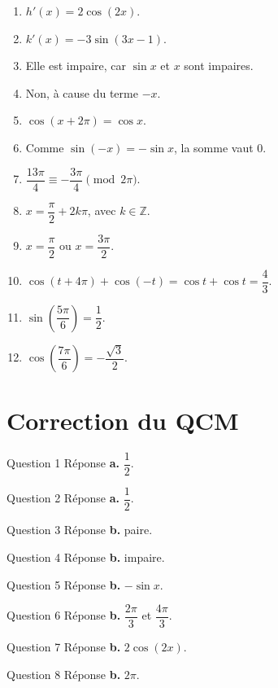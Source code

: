 \documentclass[11pt,a4paper]{article}
\newcounter{reponse}
\newenvironment{blocreponses}[1]{%
  \begin{tcolorbox}[enhanced,breakable,colback=bleuclair,colframe=bleufonce,boxrule=0.6pt,arc=2mm,left=2mm,right=2mm,top=2mm,bottom=1.5mm,title={\bfseries #1},coltitle=white,colbacktitle=bleufonce,before skip=3mm,after skip=3mm, fontupper=\large]
  \large
  \begin{enumerate}[leftmargin=*,label=\textbf{\arabic*.},itemsep=0.42em,topsep=0.5em]
  \setcounter{enumi}{\value{reponse}}
}{%
  \setcounter{reponse}{\value{enumi}}
  \end{enumerate}
  \end{tcolorbox}
}
\begin{document}
\begin{blocreponses}{Réponses 25 à 36}
\item $h'(x)=2\cos(2x)$.
\item $k'(x)=-3\sin(3x-1)$.
\item Elle est impaire, car $\sin x$ et $x$ sont impaires.
\item Non, à cause du terme $-x$.
\item $\cos(x+2\pi)=\cos x$.
\item Comme $\sin(-x)=-\sin x$, la somme vaut $0$.
\item $\dfrac{13\pi}{4}\equiv -\dfrac{3\pi}{4}\pmod{2\pi}$.
\item $x=\dfrac{\pi}{2}+2k\pi$, avec $k\in\mathbb Z$.
\item $x=\dfrac{\pi}{2}$ ou $x=\dfrac{3\pi}{2}$.
\item $\cos(t+4\pi)+\cos(-t)=\cos t+\cos t=\dfrac43$.
\item $\sin\left(\dfrac{5\pi}{6}\right)=\dfrac12$.
\item $\cos\left(\dfrac{7\pi}{6}\right)=-\dfrac{\sqrt3}{2}$.
\end{blocreponses}
\section*{Correction du QCM}
\begin{correctionbox}{Question 1}
Réponse \textbf{a.} $\dfrac12$.
\end{correctionbox}
\begin{correctionbox}{Question 2}
Réponse \textbf{a.} $\dfrac12$.
\end{correctionbox}
\begin{correctionbox}{Question 3}
Réponse \textbf{b.} paire.
\end{correctionbox}
\begin{correctionbox}{Question 4}
Réponse \textbf{b.} impaire.
\end{correctionbox}
\begin{correctionbox}{Question 5}
Réponse \textbf{b.} $-\sin x$.
\end{correctionbox}
\begin{correctionbox}{Question 6}
Réponse \textbf{b.} $\dfrac{2\pi}{3}$ et $\dfrac{4\pi}{3}$.
\end{correctionbox}
\begin{correctionbox}{Question 7}
Réponse \textbf{b.} $2\cos(2x)$.
\end{correctionbox}
\begin{correctionbox}{Question 8}
Réponse \textbf{b.} $2\pi$.
\end{correctionbox}
\end{document}
